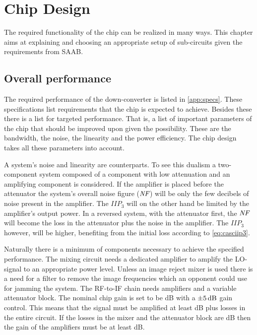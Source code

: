 \chapter{Chip Design}\label{chap:sysdes}
	
	The required functionality of the chip can be realized in many ways. This chapter aims at explaining and choosing an appropriate setup of sub-circuits given the requirements from SAAB.

	\section{Overall performance}
		The required performance of the down-converter is listed in \autoref{app:specs}. These specifications list requirements that the chip is expected to achieve. Besides these there is a list for targeted performance. That is, a list of important parameters of the chip that should be improved upon given the possibility. These are the bandwidth, the noise, the linearity and the power efficiency. The chip design takes all these parameters into account.

		A system's noise and linearity are counterparts. To see this dualism a two-component system composed of a component with low attenuation and an amplifying component is considered. If the amplifier is placed before the attenuator the system's overall noise figure ($\emph{NF}$) will be only the few decibels of noise present in the amplifier. The $IIP_3$ will on the other hand be limited by the amplifier's output power. In a reversed system, with the attenuator first, the $\emph{NF}$ will become the loss in the attenuator plus the noise in the amplifier. The $IIP_3$ however, will be higher, benefiting from the initial loss according to \autoref{eq:casciip3}.

		Naturally there is a minimum of components necessary to achieve the specified performance. The mixing circuit needs a dedicated amplifier to amplify the LO-signal to an appropriate power level. Unless an image reject mixer is used there is a need for a filter to remove the image frequencies which an opponent could use for jamming the system. The RF-to-IF chain needs amplifiers and a variable attenuator block. The nominal chip gain is set to be \unit[8--10]{dB} with a $\unit[\pm 5]{dB}$ gain control. This means that the signal must be amplified at least \unit[13]{dB} plus losses in the entire circuit. If the losses in the mixer and the attenuator block are \unit[10]{dB} then the gain of the amplifiers must be at least \unit[23]{dB}.

